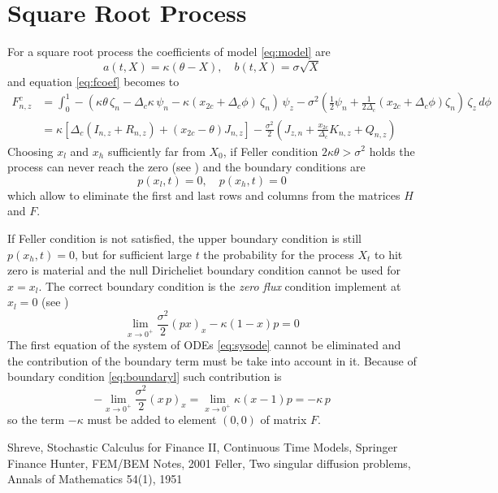 \documentclass[10pt]{article}
\newcommand {\dv}[1]{\Delta_{#1}}
\newcommand {\dvc}[0]{\dv{c}}
\begin{document}
\section{Square Root Process}

For a square root process the coefficients of model \eqref{eq:model} are
$$
   a(t,X) = \kappa(\theta-X), \quad b(t,X)=\sigma\sqrt{X}
$$
and equation \eqref{eq:fcoef} becomes to
\begin{align*}
   F^{c}_{n,z} &= \int_0^1 -(\kappa\theta\,\zeta_n - \dvc \kappa\, \psi_n-\kappa (x_{2c}+\dvc\phi)\,\zeta_n)\,\psi_z -\sigma^2\left(\frac{1}{2} \psi_n+\frac{1}{2\dvc} (x_{2c}+\dvc\phi)\zeta_n\right) \,\zeta_z\,d\phi\\
   &= \kappa[\dvc (I_{n,z}+ R_{n,z})+(x_{2c}-\theta)J_{n,z}]
     -\frac{\sigma^2}{2} \left( J_{z,n} +\frac{x_{2c}}{\dvc}K_{n,z}+Q_{n,z}\right)
\end{align*}
Choosing $x_l$ and $x_h$ sufficiently far from $X_0$, if Feller condition $2\kappa\theta>\sigma^2$ holds the process can never reach the zero (see \cite{feller}) and the boundary conditions are
$$
   p(x_l,t)=0, \quad p(x_h,t)=0
$$
which allow to eliminate the first and last rows and columns from the matrices $H$ and $F$.

\noindent If Feller condition is not satisfied, the upper boundary condition is still $p(x_h,t)=0$, but for sufficient large $t$ the probability for the process $X_t$ to hit zero is material and the null Diricheliet boundary condition cannot be used for $x=x_l$. The correct boundary condition is the \textit{zero flux} condition implement at $x_l=0$ (see \cite{feller})
\begin{equation}
\label{eq:boundaryl}
   \lim_{x\rightarrow 0^+} \frac{\sigma^2}{2}(px)_x-\kappa(1-x)p = 0
\end{equation}
The first equation of the system of ODEs \eqref{eq:sysode} cannot be eliminated and the contribution of the boundary term must be take into account in it. Because of boundary condition \eqref{eq:boundaryl} such contribution is
$$
   -\lim_{x\rightarrow 0^+} \frac{\sigma^2}{2} ( x \, p)_x = 
    \lim_{x\rightarrow 0^+} \kappa(x-1)p=-\kappa \, p
$$
so the term $-\kappa$ must be added to element $(0,0)$ of matrix $F$.

\begin{thebibliography}{9}

 Shreve, Stochastic Calculus for Finance II, Continuous Time Models, Springer Finance
 Hunter, FEM/BEM Notes, 2001
 Feller, Two singular diffusion problems, Annals of Mathematics 54(1), 1951

\end{thebibliography}
\end{document}
